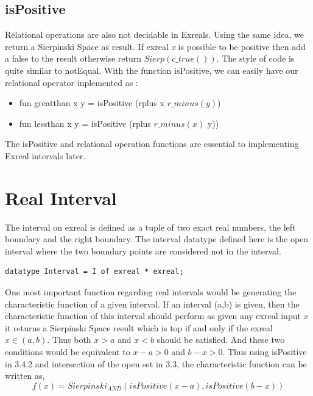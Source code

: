 \documentclass[12pt,twoside,notitlepage]{report}
\begin{document}
 
\subsection{isPositive}
Relational operations are also not decidable in Exreals. Using the same idea, we return a Sierpinski Space as result. If exreal \textit{x} is possible to be positive then add a false to the result otherwise return \textit{$Sierp(c\_true())$}. The style of code is quite similar to notEqual. With the function isPositive, we can easily have our relational operator inplemented as :\\
\begin{itemize}
\item fun greatthan x y = isPositive (rplus x $r\_minus(y)$)
\item fun lessthan x y = isPositive (rplus $r\_minus(x)$ y))
\end{itemize}

The isPositive and relational operation functions are essential to implementing Exreal intervals later.




 
\section {Real Interval}
The interval on exreal is defined as a tuple of two exact real numbers, the left boundary and the right boundary. The interval datatype defined here is the open interval where the two boundary points are considered not in the interval.\\

{
\begin{verbatim}
datatype Interval = I of exreal * exreal;
\end{verbatim}
}

One most important function regarding real intervals would be generating the characteristic function of a given interval. If an interval (a,b) is given, then the characteristic function of this interval should perform as given any exreal input $x$ it returns a Sierpinski Space result which is top if and only if the exreal $x \in (a,b)$. Thus both $x>a$ and $x<b$ should be satisfied. And these two conditions would be equivalent to $x-a>0$ and $b-x>0$. Thus using isPositive in 3.4.2 and intersection of the open set in 3.3, the characteristic function can be written as,
\begin{equation}
f(x) = Sierpinski_{AND} (isPositive(x-a), isPositive(b-x))
\end{equation}
\end{document}
